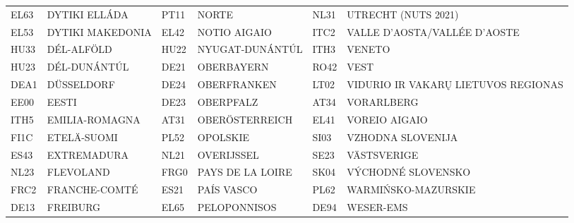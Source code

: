 \documentclass[a4paper,11pt,oneside]{article}
\begin{document}
\begin{table}
{\begin{tabular}{llllll}
EL63                & DYTIKI ELLÁDA               & PT11                & NORTE                      & NL31                & UTRECHT (NUTS 2021)                                         \\
EL53                & DYTIKI MAKEDONIA            & EL42                & NOTIO AIGAIO               & ITC2                & VALLE D’AOSTA/VALLÉE D’AOSTE                                \\
HU33                & DÉL-ALFÖLD                  & HU22                & NYUGAT-DUNÁNTÚL            & ITH3                & VENETO                                                      \\
HU23                & DÉL-DUNÁNTÚL                & DE21                & OBERBAYERN                 & RO42                & VEST                                                        \\
DEA1                & DÜSSELDORF                  & DE24                & OBERFRANKEN                & LT02                & VIDURIO IR VAKARŲ LIETUVOS REGIONAS                         \\
EE00                & EESTI                       & DE23                & OBERPFALZ                  & AT34                & VORARLBERG                                                  \\
ITH5                & EMILIA-ROMAGNA              & AT31                & OBERÖSTERREICH             & EL41                & VOREIO AIGAIO                                               \\
FI1C                & ETELÄ-SUOMI                 & PL52                & OPOLSKIE                   & SI03                & VZHODNA SLOVENIJA                                           \\
ES43                & EXTREMADURA                 & NL21                & OVERIJSSEL                 & SE23                & VÄSTSVERIGE                                                 \\
NL23                & FLEVOLAND                   & FRG0                & PAYS DE LA LOIRE           & SK04                & VÝCHODNÉ SLOVENSKO                                          \\
FRC2                & FRANCHE-COMTÉ               & ES21                & PAÍS VASCO                 & PL62                & WARMIŃSKO-MAZURSKIE                                         \\
DE13                & FREIBURG                    & EL65                & PELOPONNISOS               & DE94                & WESER-EMS                                                   \\

\end{tabular}}
\end{table}
\end{document}
